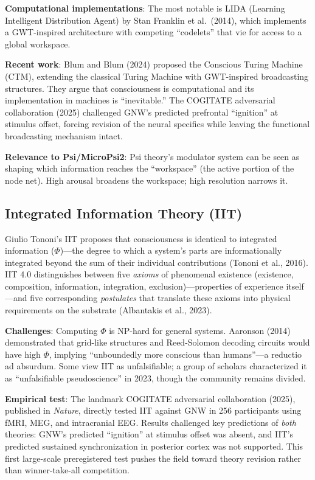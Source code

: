 \documentclass[11pt,letterpaper]{article}
\begin{document}
\textbf{Computational implementations}: The most notable is LIDA (Learning
Intelligent Distribution Agent) by Stan Franklin et al.\ (2014), which
implements a GWT-inspired architecture with competing ``codelets'' that vie
for access to a global workspace.

\textbf{Recent work}: Blum and Blum (2024) proposed the Conscious Turing
Machine (CTM), extending the classical Turing Machine with GWT-inspired
broadcasting structures. They argue that consciousness is computational and
its implementation in machines is ``inevitable.'' The COGITATE adversarial
collaboration (2025) challenged GNW's predicted prefrontal ``ignition'' at
stimulus offset, forcing revision of the neural specifics while leaving the
functional broadcasting mechanism intact.

\textbf{Relevance to Psi/MicroPsi2}: Psi theory's modulator system can be
seen as shaping which information reaches the ``workspace'' (the active
portion of the node net). High arousal broadens the workspace; high
resolution narrows it.

\subsection{Integrated Information Theory (IIT)}

Giulio Tononi's IIT proposes that consciousness is identical to integrated
information ($\Phi$)---the degree to which a system's parts are
informationally integrated beyond the sum of their individual contributions
(Tononi et al., 2016). IIT 4.0 distinguishes between five \emph{axioms}
of phenomenal existence (existence, composition, information, integration,
exclusion)---properties of experience itself---and five corresponding
\emph{postulates} that translate these axioms into physical requirements
on the substrate (Albantakis et al., 2023).

\textbf{Challenges}: Computing $\Phi$ is NP-hard for general systems.
Aaronson (2014) demonstrated that grid-like structures and Reed-Solomon
decoding circuits would have high $\Phi$, implying ``unboundedly more
conscious than humans''---a reductio ad absurdum. Some view IIT as
unfalsifiable; a group of scholars characterized it as ``unfalsifiable
pseudoscience'' in 2023, though the community remains divided.

\textbf{Empirical test}: The landmark COGITATE adversarial collaboration
(2025), published in \textit{Nature}, directly tested IIT against GNW in
256 participants using fMRI, MEG, and intracranial EEG. Results challenged
key predictions of \emph{both} theories: GNW's predicted ``ignition'' at
stimulus offset was absent, and IIT's predicted sustained synchronization
in posterior cortex was not supported. This first large-scale preregistered
test pushes the field toward theory revision rather than winner-take-all
competition.
\end{document}

